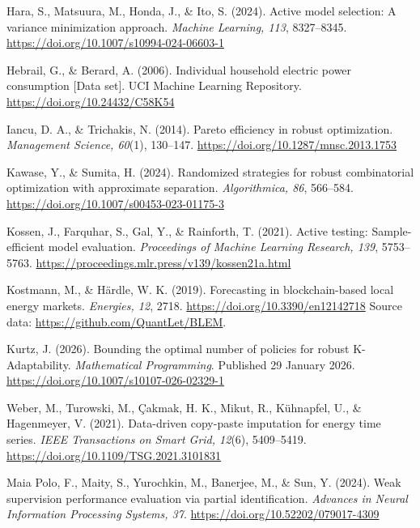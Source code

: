 Hara, S., Matsuura, M., Honda, J., \& Ito, S. (2024).
Active model selection: A variance minimization approach.
\emph{Machine Learning, 113}, 8327--8345.
\url{https://doi.org/10.1007/s10994-024-06603-1}

Hebrail, G., \& Berard, A. (2006). Individual household electric power
consumption [Data set]. UCI Machine Learning Repository.
\url{https://doi.org/10.24432/C58K54}

Iancu, D. A., \& Trichakis, N. (2014). Pareto efficiency in robust optimization.
\emph{Management Science, 60}(1), 130--147.
\url{https://doi.org/10.1287/mnsc.2013.1753}

Kawase, Y., \& Sumita, H. (2024). Randomized strategies for robust
combinatorial optimization with approximate separation.
\emph{Algorithmica, 86}, 566--584.
\url{https://doi.org/10.1007/s00453-023-01175-3}

Kossen, J., Farquhar, S., Gal, Y., \& Rainforth, T. (2021).
Active testing: Sample-efficient model evaluation.
\emph{Proceedings of Machine Learning Research, 139}, 5753--5763.
\url{https://proceedings.mlr.press/v139/kossen21a.html}

Kostmann, M., \& H\"ardle, W. K. (2019). Forecasting in blockchain-based
local energy markets. \emph{Energies, 12}, 2718.
\url{https://doi.org/10.3390/en12142718}
Source data: \url{https://github.com/QuantLet/BLEM}.

Kurtz, J. (2026). Bounding the optimal number of policies for robust
K-Adaptability. \emph{Mathematical Programming}. Published 29 January 2026.
\url{https://doi.org/10.1007/s10107-026-02329-1}

Weber, M., Turowski, M., \c{C}akmak, H. K., Mikut, R., K\"uhnapfel, U.,
\& Hagenmeyer, V. (2021). Data-driven copy-paste imputation for energy
time series. \emph{IEEE Transactions on Smart Grid, 12}(6), 5409--5419.
\url{https://doi.org/10.1109/TSG.2021.3101831}

Maia Polo, F., Maity, S., Yurochkin, M., Banerjee, M., \& Sun, Y. (2024).
Weak supervision performance evaluation via partial identification.
\emph{Advances in Neural Information Processing Systems, 37}.
\url{https://doi.org/10.52202/079017-4309}

